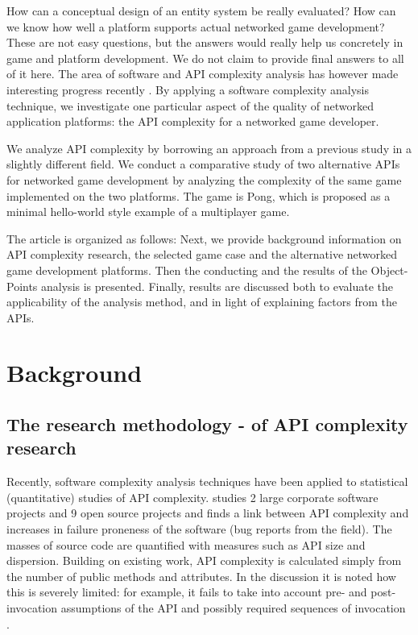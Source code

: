 \documentclass[conference]{IEEEtran}
\begin{document}
How can a conceptual design of an entity system be really evaluated?
How can we know how well a platform supports actual networked game
development? These are not easy questions, but the answers would
really help us concretely in game and platform development. We do not
claim to provide final answers to all of it here. The area of software
and API complexity analysis has however made interesting progress
recently \cite{api-complexity-analysis,cmu-api_failures}. By applying a
software complexity analysis technique, we investigate one particular
aspect of the quality of networked application platforms: the API
complexity for a networked game developer.

We analyze API complexity by borrowing an approach from a previous
study in a slightly different field. We conduct a comparative study of
two alternative APIs for networked game development by analyzing the
complexity of the same game implemented on the two platforms. The game
is Pong, which is proposed as a minimal hello-world style example of a
multiplayer game.

The article is organized as follows: Next, we provide background
information on API complexity research, the selected game case and the
alternative networked game development platforms. Then the conducting
and the results of the Object-Points analysis is presented. Finally,
results are discussed both to evaluate the applicability of the
analysis method, and in light of explaining factors from the APIs.



\section{Background%
  \label{background}%
}


\subsection{The research methodology - of API complexity research%
  \label{the-research-methodology-of-api-complexity-research}%
}

Recently, software complexity analysis techniques have been applied to
statistical (quantitative) studies of API
complexity. \cite{cmu-api_failures} studies 2 large corporate software
projects and 9 open source projects and finds a link between API
complexity and increases in failure proneness of the software (bug
reports from the field). The masses of source code are quantified with
measures such as API size and dispersion. Building on existing work,
API complexity is calculated simply from the number of public methods
and attributes. In the discussion it is noted how this is severely
limited: for example, it fails to take into account pre- and
post-invocation assumptions of the API and possibly required sequences
of invocation \cite{cmu-api_failures}.
\end{document}

